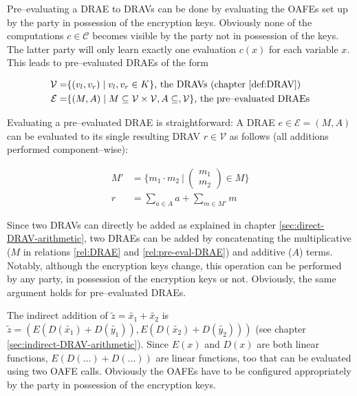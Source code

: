 Pre--evaluating a DRAE to DRAVs can be done by evaluating the OAFEs set up by
the party in possession of the encryption keys. Obviously none of the
computations $c \in \mathcal{C}$ becomes visible by the party not in possession
of the keys. The latter party will only learn exactly one evaluation $c(x)$ for
each variable $x$. This leads to pre--evaluated DRAEs of the form

\begin{align}
  \mathcal{V} = & \{ (v_l, v_r) \mid v_l, v_r \in K \}
  \text{, the DRAVs (chapter \ref{def:DRAV})} \nonumber\\
%
  \label{rel:pre-eval-DRAE}
  \mathcal{E} = & \{ (M, A) \mid
      M \subseteq \mathcal{V} \times \mathcal{V}, A \subseteq, \mathcal{V} \}
      \text{, the pre--evaluated DRAEs}
\end{align}

Evaluating a pre--evaluated DRAE is straightforward: A DRAE $e \in \mathcal{E} =
(M,A)$ can be evaluated to its single resulting DRAV $r \in \mathcal{V}$ as
follows (all additions performed component--wise):

\begin{align*}
M' &= \Bigg\{ m_1 \cdot m_2\ \Bigg|\ \begin{pmatrix}m_1\\m_2\end{pmatrix}
\in M \Bigg\} \\
r & = \sum_{a \in A}a + \sum_{m \in M'}m
\end{align*}




Since two DRAVs can directly be added as explained in chapter
\ref{sec:direct-DRAV-arithmetic}, two DRAEs can be added by concatenating the
multiplicative ($M$ in relations \ref{rel:DRAE} and \ref{rel:pre-eval-DRAE}) and
additive ($A$) terms. Notably, although the encryption keys change, this
operation can be performed by any party, in possession of the encryption keys or
not. Obviously, the same argument holds for pre--evaluated DRAEs.



The indirect addition of $\widetilde{z} = \widetilde{x_1} + \widetilde{x_2}$ is
$\widetilde{z} =
\left( E\left(D(\widetilde{x_1}) + D(\widetilde{y_1})\right),
       E\left(D(\widetilde{x_2}) + D(\widetilde{y_2})\right)
\right)$
(see chapter \ref{sec:indirect-DRAV-arithmetic}).
Since $E(x)$ and $D(x)$ are both linear functions, $E\left(D(\ldots)
+D(\ldots)\right)$ are linear functions, too that can be evaluated using two
OAFE calls.  Obviously the OAFEs have to be configured appropriately by the
party in possession of the encryption keys.


